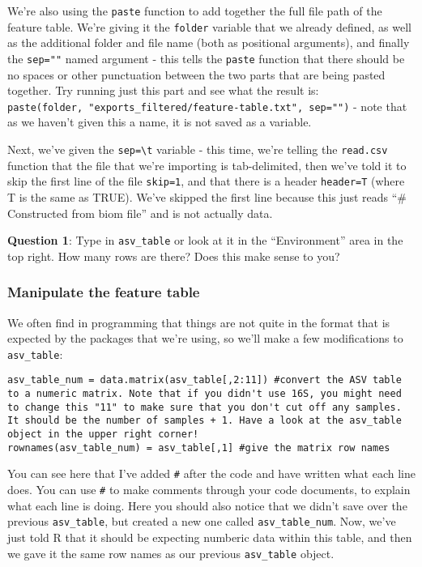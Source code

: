\documentclass[
]{book}
\begin{document}
We're also using the \texttt{paste} function to add together the full file path of the feature table. We're giving it the \texttt{folder} variable that we already defined, as well as the additional folder and file name (both as positional arguments), and finally the \texttt{sep=""} named argument - this tells the \texttt{paste} function that there should be no spaces or other punctuation between the two parts that are being pasted together. Try running just this part and see what the result is: \texttt{paste(folder,\ "exports\_filtered/feature-table.txt",\ sep="")} - note that as we haven't given this a name, it is not saved as a variable.

Next, we've given the \texttt{sep=\textquotesingle{}\textbackslash{}t\textquotesingle{}} variable - this time, we're telling the \texttt{read.csv} function that the file that we're importing is tab-delimited, then we've told it to skip the first line of the file \texttt{skip=1}, and that there is a header \texttt{header=T} (where T is the same as TRUE). We've skipped the first line because this just reads ``\# Constructed from biom file'' and is not actually data.

\textbf{Question 1}: Type in \texttt{asv\_table} or look at it in the ``Environment'' area in the top right. How many rows are there? Does this make sense to you?

\subsubsection{Manipulate the feature table}\label{manipulate-the-feature-table}

We often find in programming that things are not quite in the format that is expected by the packages that we're using, so we'll make a few modifications to \texttt{asv\_table}:

\begin{verbatim}
asv_table_num = data.matrix(asv_table[,2:11]) #convert the ASV table to a numeric matrix. Note that if you didn't use 16S, you might need to change this "11" to make sure that you don't cut off any samples. It should be the number of samples + 1. Have a look at the asv_table object in the upper right corner!
rownames(asv_table_num) = asv_table[,1] #give the matrix row names
\end{verbatim}

You can see here that I've added \texttt{\#} after the code and have written what each line does. You can use \texttt{\#} to make comments through your code documents, to explain what each line is doing. Here you should also notice that we didn't save over the previous \texttt{asv\_table}, but created a new one called \texttt{asv\_table\_num}. Now, we've just told R that it should be expecting numberic data within this table, and then we gave it the same row names as our previous \texttt{asv\_table} object.
\end{document}
